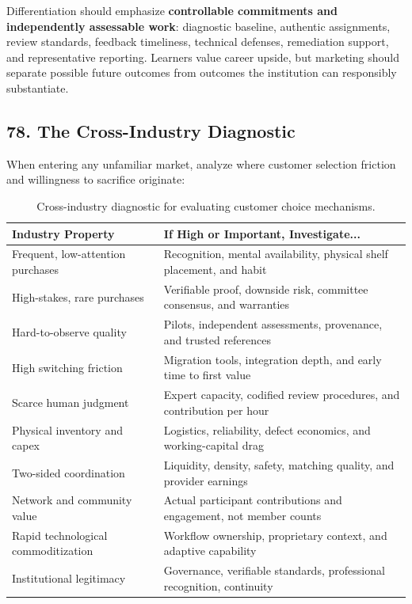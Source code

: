 Differentiation should emphasize \textbf{controllable commitments and independently assessable work}: diagnostic baseline, authentic assignments, review standards, feedback timeliness, technical defenses, remediation support, and representative reporting. Learners value career upside, but marketing should separate possible future outcomes from outcomes the institution can responsibly substantiate.

\subsection*{78. The Cross-Industry Diagnostic}

When entering any unfamiliar market, analyze where customer selection friction and willingness to sacrifice originate:

\begin{table}[t]
\centering
\small
\begin{tabularx}{\textwidth}{>{\raggedright\arraybackslash}p{5.5cm} >{\raggedright\arraybackslash}X}
\toprule
\textbf{Industry Property} & \textbf{If High or Important, Investigate...} \\
\midrule
Frequent, low-attention purchases & Recognition, mental availability, physical shelf placement, and habit \\
High-stakes, rare purchases & Verifiable proof, downside risk, committee consensus, and warranties \\
Hard-to-observe quality & Pilots, independent assessments, provenance, and trusted references \\
High switching friction & Migration tools, integration depth, and early time to first value \\
Scarce human judgment & Expert capacity, codified review procedures, and contribution per hour \\
Physical inventory and capex & Logistics, reliability, defect economics, and working-capital drag \\
Two-sided coordination & Liquidity, density, safety, matching quality, and provider earnings \\
Network and community value & Actual participant contributions and engagement, not member counts \\
Rapid technological commoditization & Workflow ownership, proprietary context, and adaptive capability \\
Institutional legitimacy & Governance, verifiable standards, professional recognition, continuity \\
\bottomrule
\end{tabularx}
\caption{Cross-industry diagnostic for evaluating customer choice mechanisms.}
\label{tab:ch8-industry-diagnostic}
\end{table}
